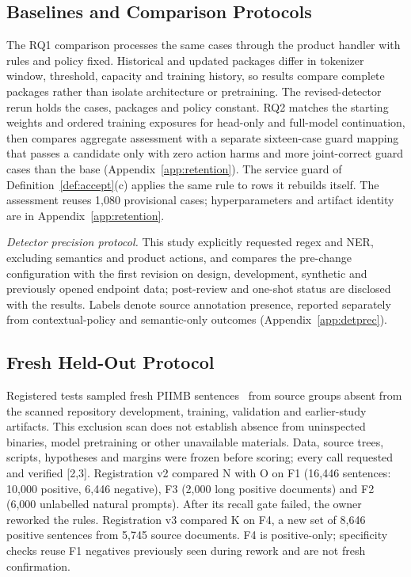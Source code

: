 \documentclass[sigconf]{acmart}
\theoremstyle{acmdefinition}\newtheorem{property}{Property}
\begin{document}
\subsection{Baselines and Comparison Protocols}
The RQ1 comparison processes the same cases through the product handler with rules and policy fixed. Historical and updated packages differ in tokenizer window, threshold, capacity and training history, so results compare complete packages rather than isolate architecture or pretraining. The revised-detector rerun holds the cases, packages and policy constant. RQ2 matches the starting weights and ordered training exposures for head-only and full-model continuation, then compares aggregate assessment with a separate sixteen-case guard mapping that passes a candidate only with zero action harms and more joint-correct guard cases than the base (Appendix~\ref{app:retention}). The service guard of Definition~\ref{def:accept}(c) applies the same rule to rows it rebuilds itself. The assessment reuses 1,080 provisional cases; hyperparameters and artifact identity are in Appendix~\ref{app:retention}.

\textit{Detector precision protocol.} This study explicitly requested regex and NER, excluding semantics and product actions, and compares the pre-change configuration with the first revision on design, development, synthetic and previously opened endpoint data; post-review and one-shot status are disclosed with the results. Labels denote source annotation presence, reported separately from contextual-policy and semantic-only outcomes (Appendix~\ref{app:detprec}).

\subsection{Fresh Held-Out Protocol}
\label{sec:heldout_protocol}
Registered tests sampled fresh PIIMB sentences~\cite{PIIMBPinned2026} from source groups absent from the scanned repository development, training, validation and earlier-study artifacts. This exclusion scan does not establish absence from uninspected binaries, model pretraining or other unavailable materials. Data, source trees, scripts, hypotheses and margins were frozen before scoring; every call requested and verified [2,3]. Registration v2 compared N with O on F1 (16,446 sentences: 10,000 positive, 6,446 negative), F3 (2,000 long positive documents) and F2 (6,000 unlabelled natural prompts). After its recall gate failed, the owner reworked the rules. Registration v3 compared K on F4, a new set of 8,646 positive sentences from 5,745 source documents. F4 is positive-only; specificity checks reuse F1 negatives previously seen during rework and are not fresh confirmation.
\end{document}
